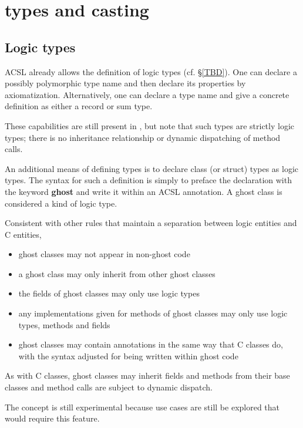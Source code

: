 \section{\lang{} types and casting}
\label{sec:types}

\subsection{Logic types}

ACSL already allows the definition of logic types (cf. \S\ref{TBD}). One can  declare a possibly polymorphic type name and then declare its properties by axiomatization. Alternatively, one can declare 
a type name and give a concrete definition as either a record or sum type.

These capabilities are still present in \NAME{}, but note that such types are strictly logic types; there is no inheritance relationship or dynamic dispatching of method calls.

\experimental

An additional means of defining types is to declare
\lang{} class (or struct) types as logic types. The syntax for such a definition is simply to preface the declaration
with the keyword \textbf{ghost} and write it within an ACSL annotation. A ghost class is considered a kind of logic type.

Consistent with other rules that maintain a separation between logic entities and C entities,
\begin{itemize}
	\item ghost classes may not appear in non-ghost code
	\item a ghost class may only inherit from other ghost classes
	\item the fields of ghost classes may only use logic types
	\item any implementations given for methods of ghost classes may only use logic types, methods and fields
	\item ghost classes may contain \NAME{} annotations in the same way that C classes do, with the syntax adjusted for being written within ghost code
\end{itemize}

As with C classes, ghost classes may inherit fields and methods from their base classes and method calls are subject to dynamic dispatch.

The concept is still experimental because use cases are still be explored that would require this feature.

